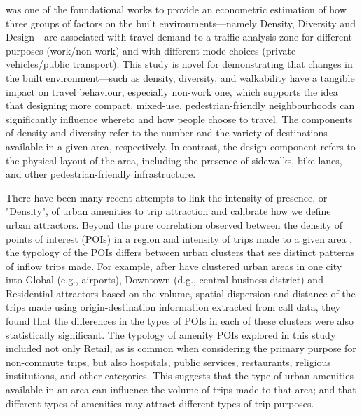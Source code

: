 \citet{cerveroTravelDemand3Ds1997} was one of the foundational works to provide an econometric estimation of how three groups of factors on the built environments---namely Density, Diversity and Design---are associated with travel demand to a traffic analysis zone for different purposes (work/non-work) and with different mode choices (private vehicles/public transport). This study is novel for demonstrating that changes in the built environment—such as density, diversity, and walkability have a tangible impact on travel behaviour, especially non-work one, which supports the idea that designing more compact, mixed-use, pedestrian-friendly neighbourhoods can significantly influence whereto and how people choose to travel. The components of density and diversity refer to the number and the variety of destinations available in a given area, respectively. In contrast, the design component refers to the physical layout of the area, including the presence of sidewalks, bike lanes, and other pedestrian-friendly infrastructure.

There have been many recent attempts to link the intensity of presence, or "Density", of urban amenities to trip attraction and calibrate how we define urban attractors. Beyond the pure correlation observed between the density of points of interest (POIs) in a region and intensity of trips made to a given area \citep{melikovCharacterizingUrbanMobility2021}, the typology of the POIs differs between urban clusters that see distinct patterns of inflow trips made. For example, after \citet{aaqibjavedEstimationTripAttraction2020} have clustered urban areas in one city into Global (e.g., airports), Downtown (d.g., central business district) and Residential attractors based on the volume, spatial dispersion and distance of the trips made using origin-destination information extracted from call data, they found that the differences in the types of POIs in each of these clusters were also statistically significant. The typology of amenity POIs explored in this study included not only Retail, as is common when considering the primary purpose for non-commute trips, but also hospitals, public services, restaurants, religious institutions, and other categories. This suggests that the type of urban amenities available in an area can influence the volume of trips made to that area; and that different types of amenities may attract different types of trip purposes.

